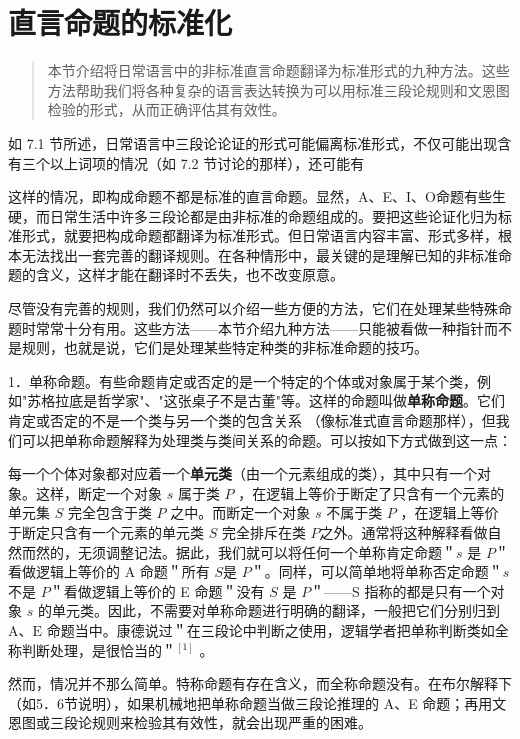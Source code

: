 \section{直言命题的标准化}

\begin{quotation}
本节介绍将日常语言中的非标准直言命题翻译为标准形式的九种方法。这些方法帮助我们将各种复杂的语言表达转换为可以用标准三段论规则和文恩图检验的形式，从而正确评估其有效性。
\end{quotation}

如 7.1 节所述，日常语言中三段论论证的形式可能偏离标准形式，不仅可能出现含有三个以上词项的情况（如 7.2 节讨论的那样），还可能有

这样的情况，即构成命题不都是标准的直言命题。显然，A、E、I、O命题有些生硬，而日常生活中许多三段论都是由非标准的命题组成的。要把这些论证化归为标准形式，就要把构成命题都翻译为标准形式。但日常语言内容丰富、形式多样，根本无法找出一套完善的翻译规则。在各种情形中，最关键的是理解已知的非标准命题的含义，这样才能在翻译时不丢失，也不改变原意。

尽管没有完善的规则，我们仍然可以介绍一些方便的方法，它们在处理某些特殊命题时常常十分有用。这些方法——本节介绍九种方法——只能被看做一种指针而不是规则，也就是说，它们是处理某些特定种类的非标准命题的技巧。

1．单称命题。有些命题肯定或否定的是一个特定的个体或对象属于某个类，例如"苏格拉底是哲学家"、"这张桌子不是古董"等。这样的命题叫做\textbf{单称命题}。它们肯定或否定的不是一个类与另一个类的包含关系 （像标准式直言命题那样），但我们可以把单称命题解释为处理类与类间关系的命题。可以按如下方式做到这一点：

每一个个体对象都对应着一个\textbf{单元类}（由一个元素组成的类），其中只有一个对象。这样，断定一个对象 $s$ 属于类 $P$ ，在逻辑上等价于断定了只含有一个元素的单元集 $S$ 完全包含于类 $P$ 之中。而断定一个对象 $s$ 不属于类 $P$ ，在逻辑上等价于断定只含有一个元素的单元类 $S$ 完全排斥在类 $P$之外。通常将这种解释看做自然而然的，无须调整记法。据此，我们就可以将任何一个单称肯定命题＂$s$ 是 $P$＂看做逻辑上等价的 A 命题＂所有 $S$是 $P$＂。同样，可以简单地将单称否定命题＂$s$ 不是 $P$＂看做逻辑上等价的 E 命题＂没有 $S$ 是 $P$＂——S 指称的都是只有一个对象 $s$ 的单元类。因此，不需要对单称命题进行明确的翻译，一般把它们分别归到 $\mathrm{A} 、 \mathrm{E}$ 命题当中。康德说过＂在三段论中判断之使用，逻辑学者把单称判断类如全称判断处理，是很恰当的＂${ }^{[1]}$ 。

然而，情况并不那么简单。特称命题有存在含义，而全称命题没有。在布尔解释下（如5．6节说明），如果机械地把单称命题当做三段论推理的 A、E 命题；再用文恩图或三段论规则来检验其有效性，就会出现严重的困难。

